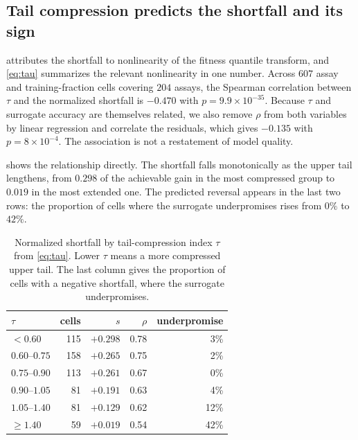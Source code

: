 \documentclass{article}
\theoremstyle{plain}
\theoremstyle{definition}
\begin{document}
\subsection{Tail compression predicts the shortfall and its sign}
\label{sec:results-tau}

 attributes the shortfall to nonlinearity of the fitness quantile
transform, and \cref{eq:tau} summarizes the relevant nonlinearity in one number. Across
$607$ assay and training-fraction cells covering $204$ assays, the Spearman correlation
between $\tau$ and the normalized shortfall is $-0.470$ with $p = 9.9 \times 10^{-35}$.
Because $\tau$ and surrogate accuracy are themselves related, we also remove $\rho$
from both variables by linear regression and correlate the residuals, which gives
$-0.135$ with $p = 8 \times 10^{-4}$. The association is not a restatement of model
quality.

 shows the relationship directly. The shortfall falls monotonically as
the upper tail lengthens, from $0.298$ of the achievable gain in the most compressed
group to $0.019$ in the most extended one. The predicted reversal appears in the last
two rows: the proportion of cells where the surrogate underpromises rises from $0\%$ to
$42\%$.

\begin{table}[t]
\caption{Normalized shortfall by tail-compression index $\tau$ from \cref{eq:tau}.
Lower $\tau$ means a more compressed upper tail. The last column gives the proportion
of cells with a negative shortfall, where the surrogate underpromises.}
\label{tab:tau}
\vskip 0.1in
\begin{center}
\begin{small}
\begin{tabular}{lrrrr}
\toprule
$\tau$ & cells & $s$ & $\rho$ & underpromise \\
\midrule
$<0.60$        & 115 & $+0.298$ & 0.78 & \phantom{0}3\% \\
$0.60$--$0.75$ & 158 & $+0.265$ & 0.75 & \phantom{0}2\% \\
$0.75$--$0.90$ & 113 & $+0.261$ & 0.67 & \phantom{0}0\% \\
$0.90$--$1.05$ & 81  & $+0.191$ & 0.63 & \phantom{0}4\% \\
$1.05$--$1.40$ & 81  & $+0.129$ & 0.62 & 12\% \\
$\ge 1.40$     & 59  & $+0.019$ & 0.54 & 42\% \\
\bottomrule
\end{tabular}
\end{small}
\end{center}
\vskip -0.1in
\end{table}
\end{document}
